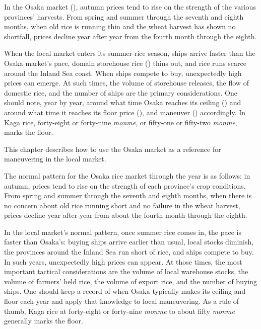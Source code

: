 \begin{sokyubox}
{\small\itshape\color{sokyubar} }

\medskip
In the Osaka market (), autumn prices tend to
rise on the strength of the various provinces' harvests. From spring
and summer through the seventh and eighth months, when old rice is
running thin and the wheat harvest has shown no shortfall, prices
decline year after year from the fourth month through the eighth.

When the local market enters its summer-rice season, ships arrive
faster than the Osaka market's pace, domain storehouse rice
() thins out, and rice runs scarce around the
Inland Sea coast. When ships compete to buy, unexpectedly high
prices can emerge. At such times, the volume of storehouse releases,
the flow of domestic rice, and the number of ships are the primary
considerations. One should note, year by year, around what time
Osaka reaches its ceiling () and around what time it
reaches its floor price (), and maneuver
() accordingly. In Kaga rice, forty-eight or
forty-nine \textit{monme}, or fifty-one or fifty-two \textit{monme}, marks the floor.
\end{sokyubox}

\commentary
This chapter describes how to use the Osaka market as a reference
for maneuvering in the local market.

The normal pattern for the Osaka rice market through the year is as
follows: in autumn, prices tend to rise on the strength of each
province's crop conditions. From spring and summer through the
seventh and eighth months, when there is no concern about old rice
running short and no failure in the wheat harvest, prices decline
year after year from about the fourth month through the eighth.

In the local market's normal pattern, once summer rice comes in, the
pace is faster than Osaka's: buying ships arrive earlier than usual,
local stocks diminish, the provinces around the Inland Sea run short
of rice, and ships compete to buy. In such years, unexpectedly high
prices can appear. At those times, the most important tactical
considerations are the volume of local warehouse stocks, the volume
of farmers' held rice, the volume of export rice, and the number
of buying ships. One should keep a record of when Osaka typically
makes its ceiling and floor each year and apply that knowledge to
local maneuvering. As a rule of thumb, Kaga rice at forty-eight or
forty-nine \textit{monme} to about fifty \textit{monme} generally marks the floor.

